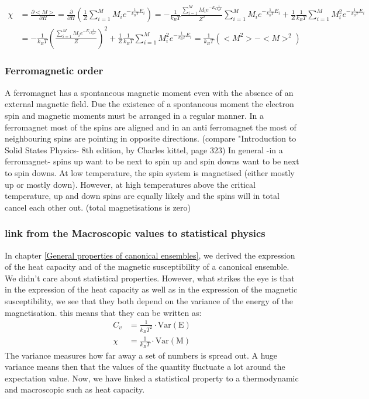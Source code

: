 \documentclass[10pt,a4paper]{article}
\begin{document}
\begin{align}
\chi &=\frac{\partial <M>}{\partial H} = \frac{\partial}{\partial H} \left( \frac{1}{Z }\sum_{i=1}^{M}M_i e ^{ - \frac {1}{k_BT} E_i}\right) = -\frac{1}{k_B T } \frac{\sum_{i=1}^{M} M_i e^{-E_i \frac{1}{k_BT}}}{ Z^2}\sum_{i=1}^{M}M_i e ^{ - \frac {1}{k_BT} E_i} +\frac{1}{Z}\frac{1}{k_BT}\sum_{i=1}^{M}M_i^2 e ^{ - \frac {1}{k_BT} E_i} \\
 &= -\frac{1}{k_B T} \left( \frac{\sum_{i=1}^{M} M_i e^{-E_i \frac{1}{k_BT}}}{ Z} \right)^2 +\frac{1}{Z}\frac{1}{k_BT}\sum_{i=1}^{M}M_i^2 e ^{ - \frac {1}{k_BT} E_i} = \frac{1}{k_B T } \left( <M^2> - <M>^2 \right)
\end{align}


\subsubsection{Ferromagnetic order}
A ferromagnet has a spontaneous magnetic moment even with the absence of an external magnetic field. Due the existence of a spontaneous moment the electron spin and magnetic moments must be arranged in a regular manner.
In a ferromagnet most of the spins are aligned and in an  anti ferromagnet the most of neighbouring spins are pointing in opposite directions.
(compare "Introduction to Solid States Physics- 8th edition, by Charles kittel, page 323)
In general -in a ferromagnet- spins up want to be next to spin up and spin downs want to be next to spin downs. At low temperature, the spin system is magnetised (either mostly up or mostly down). However, at high temperatures above the critical temperature, up and down spins are equally likely and the spins will in total cancel each other out. (total magnetisations is zero)

\subsubsection{link from the Macroscopic values to statistical physics}
In chapter \ref{General properties of canonical ensembles}, we derived the expression of the heat capacity and of the magnetic susceptibility of a canonical ensemble. We didn't care about statistical properties. However, what strikes the eye is that in the expression of the heat capacity as well as in the expression of the magnetic susceptibility, we see that they both depend on the variance of the energy of the magnetisation. this means that they can be written as:
\begin{align}
C_v &= \frac{1}{k_B T^2}\cdot \mathrm{Var(E)}\\
\chi &= \frac{1}{k_B T} \cdot \mathrm{Var(M)}
\end{align}
The variance measures how far away a set of numbers is spread out. A huge variance means then that the values of the quantity fluctuate a lot around the expectation value.  Now, we have linked a statistical property to a thermodynamic and macroscopic such as heat capacity. 
\end{document}
